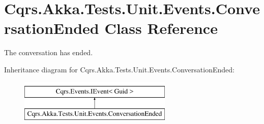 \hypertarget{classCqrs_1_1Akka_1_1Tests_1_1Unit_1_1Events_1_1ConversationEnded}{}\section{Cqrs.\+Akka.\+Tests.\+Unit.\+Events.\+Conversation\+Ended Class Reference}
\label{classCqrs_1_1Akka_1_1Tests_1_1Unit_1_1Events_1_1ConversationEnded}


The conversation has ended.  


Inheritance diagram for Cqrs.\+Akka.\+Tests.\+Unit.\+Events.\+Conversation\+Ended\+:\begin{figure}[H]
\begin{center}
\leavevmode
\includegraphics[height=2.000000cm]{classCqrs_1_1Akka_1_1Tests_1_1Unit_1_1Events_1_1ConversationEnded}
\end{center}
\end{figure}

